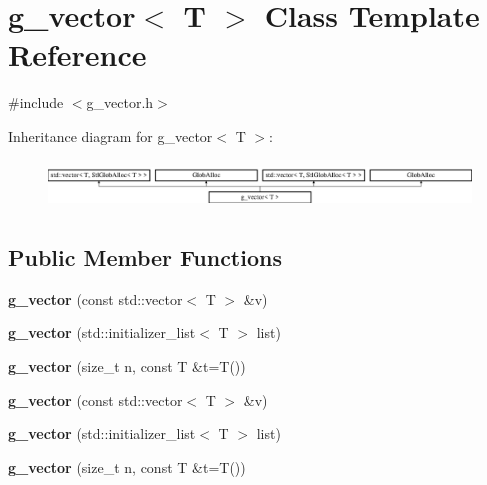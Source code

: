\hypertarget{classg__vector}{\section{g\-\_\-vector$<$ T $>$ Class Template Reference}
\label{classg__vector}
}


{\ttfamily \#include $<$g\-\_\-vector.\-h$>$}

Inheritance diagram for g\-\_\-vector$<$ T $>$\-:\begin{figure}[H]
\begin{center}
\leavevmode
\includegraphics[height=1.284404cm]{classg__vector}
\end{center}
\end{figure}
\subsection*{Public Member Functions}
\begin{DoxyCompactItemize}
\item 
\hypertarget{classg__vector_a841008e1a1bc291d6adc1270b11a24af}{{\bfseries g\-\_\-vector} (const std\-::vector$<$ T $>$ \&v)}\label{classg__vector_a841008e1a1bc291d6adc1270b11a24af}

\item 
\hypertarget{classg__vector_a53b5a5767a0469de349476d46b19d0c1}{{\bfseries g\-\_\-vector} (std\-::initializer\-\_\-list$<$ T $>$ list)}\label{classg__vector_a53b5a5767a0469de349476d46b19d0c1}

\item 
\hypertarget{classg__vector_a5a4d8be1c38812b64f1cec7abdeb3c3c}{{\bfseries g\-\_\-vector} (size\-\_\-t n, const T \&t=T())}\label{classg__vector_a5a4d8be1c38812b64f1cec7abdeb3c3c}

\item 
\hypertarget{classg__vector_a841008e1a1bc291d6adc1270b11a24af}{{\bfseries g\-\_\-vector} (const std\-::vector$<$ T $>$ \&v)}\label{classg__vector_a841008e1a1bc291d6adc1270b11a24af}

\item 
\hypertarget{classg__vector_a53b5a5767a0469de349476d46b19d0c1}{{\bfseries g\-\_\-vector} (std\-::initializer\-\_\-list$<$ T $>$ list)}\label{classg__vector_a53b5a5767a0469de349476d46b19d0c1}

\item 
\hypertarget{classg__vector_a5a4d8be1c38812b64f1cec7abdeb3c3c}{{\bfseries g\-\_\-vector} (size\-\_\-t n, const T \&t=T())}\label{classg__vector_a5a4d8be1c38812b64f1cec7abdeb3c3c}

\end{DoxyCompactItemize}


